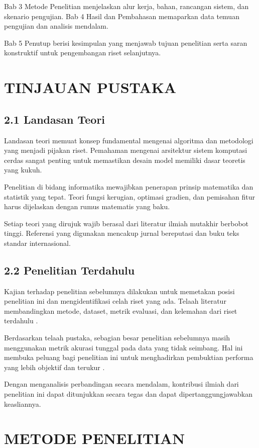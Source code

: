\documentclass[12pt,a4paper,oneside]{report}
\begin{document}
Bab 3 Metode Penelitian menjelaskan alur kerja, bahan, rancangan sistem, dan skenario pengujian.
Bab 4 Hasil dan Pembahasan memaparkan data temuan pengujian dan analisis mendalam.

Bab 5 Penutup berisi kesimpulan yang menjawab tujuan penelitian serta saran konstruktif untuk pengembangan riset selanjutnya.

\chapter{TINJAUAN PUSTAKA}
\section{2.1 Landasan Teori}
Landasan teori memuat konsep fundamental mengenai algoritma dan metodologi yang menjadi pijakan riset. Pemahaman mengenai arsitektur sistem komputasi cerdas sangat penting untuk memastikan desain model memiliki dasar teoretis yang kukuh.

Penelitian di bidang informatika mewajibkan penerapan prinsip matematika dan statistik yang tepat. Teori fungsi kerugian, optimasi gradien, dan pemisahan fitur harus dijelaskan dengan rumus matematis yang baku.

Setiap teori yang dirujuk wajib berasal dari literatur ilmiah mutakhir berbobot tinggi. Referensi yang digunakan mencakup jurnal bereputasi dan buku teks standar internasional.

\section{2.2 Penelitian Terdahulu}
Kajian terhadap penelitian sebelumnya dilakukan untuk memetakan posisi penelitian ini dan mengidentifikasi celah riset yang ada. Telaah literatur membandingkan metode, dataset, metrik evaluasi, dan kelemahan dari riset terdahulu \parencite{sari2022penerapan}.

Berdasarkan telaah pustaka, sebagian besar penelitian sebelumnya masih menggunakan metrik akurasi tunggal pada data yang tidak seimbang. Hal ini membuka peluang bagi penelitian ini untuk menghadirkan pembuktian performa yang lebih objektif dan terukur \parencite{pressman2020software}.

Dengan menganalisis perbandingan secara mendalam, kontribusi ilmiah dari penelitian ini dapat ditunjukkan secara tegas dan dapat dipertanggungjawabkan keasliannya.

\chapter{METODE PENELITIAN}
\end{document}

